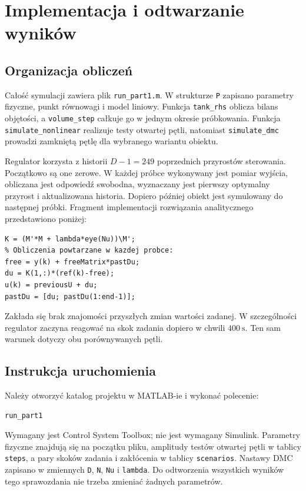 \chapter{Implementacja i odtwarzanie wyników}
\section{Organizacja obliczeń}
Całość symulacji zawiera plik \texttt{run\_part1.m}. W strukturze \texttt{P} zapisano parametry fizyczne, punkt równowagi i model liniowy. Funkcja \texttt{tank\_rhs} oblicza bilans objętości, a \texttt{volume\_step} całkuje go w jednym okresie próbkowania. Funkcja \texttt{simulate\_nonlinear} realizuje testy otwartej pętli, natomiast \texttt{simulate\_dmc} prowadzi zamkniętą pętlę dla wybranego wariantu obiektu.

Regulator korzysta z historii $D-1=249$ poprzednich przyrostów sterowania. Początkowo są one zerowe. W każdej próbce wykonywany jest pomiar wyjścia, obliczana jest odpowiedź swobodna, wyznaczany jest pierwszy optymalny przyrost i aktualizowana historia. Dopiero później obiekt jest symulowany do następnej próbki. Fragment implementacji rozwiązania analitycznego przedstawiono poniżej:
\begin{lstlisting}[style=custommatlab]
K = (M'*M + lambda*eye(Nu))\M';
% Obliczenia powtarzane w kazdej probce:
free = y(k) + freeMatrix*pastDu;
du = K(1,:)*(ref(k)-free);
u(k) = previousU + du;
pastDu = [du; pastDu(1:end-1)];
\end{lstlisting}
Zakłada się brak znajomości przyszłych zmian wartości zadanej. W szczególności regulator zaczyna reagować na skok zadania dopiero w chwili $400\ \mathrm{s}$. Ten sam warunek dotyczy obu porównywanych pętli.

\section{Instrukcja uruchomienia}
Należy otworzyć katalog projektu w MATLAB-ie i wykonać polecenie:
\begin{lstlisting}[style=custommatlab]
run_part1
\end{lstlisting}
Wymagany jest Control System Toolbox; nie jest wymagany Simulink. Parametry fizyczne znajdują się na początku pliku, amplitudy testów otwartej pętli w tablicy \texttt{steps}, a pary skoków zadania i zakłócenia w tablicy \texttt{scenarios}. Nastawy DMC zapisano w zmiennych \texttt{D}, \texttt{N}, \texttt{Nu} i \texttt{lambda}. Do odtworzenia wszystkich wyników tego sprawozdania nie trzeba zmieniać żadnych parametrów.


